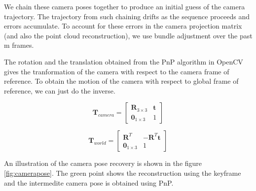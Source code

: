 \documentclass{article}
\begin{document}
We chain these camera poses together to produce an initial guess of the camera trajectory. The trajectory from such chaining drifts as the sequence proceeds and errors accumulate. To account for these errors in the camera projection matrix (and also the point cloud reconstruction), we use bundle adjustment over the past m frames.

The rotation and the translation obtained from the PnP algorithm in OpenCV gives the tranformation of the camera with respect to the camera frame of reference. To obtain the motion of the camera with respect to global frame of reference, we can just do the inverse.

$$ \textbf{T}_{camera}  = \begin{bmatrix}
\textbf{R}_{3\times3} & \textbf{t} \\
\textbf{0}_{1\times3} & 1
\end{bmatrix} $$

$$ \textbf{T}_{world}  = \begin{bmatrix}
\textbf{R}^T  & -\textbf{R}^T \textbf{t}\\
\textbf{0}_{1\times3} & 1
\end{bmatrix} $$


An illustration of the camera pose recovery is shown in the figure \ref{fig:camerapose}. The green point shows the reconstruction using the keyframe and the intermedite camera pose is obtained using PnP.
\end{document}

